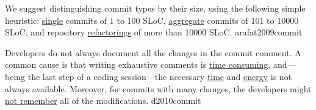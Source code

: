 \documentclass{article}
\begin{document}

  {We suggest distinguishing commit types by their size, using the following simple heuristic: \ul{single} commits of 1 to 100 SLoC, \ul{aggregate} commits of 101 to 10000 SLoC, and repository \ul{refactorings} of more than 10000 SLoC.}
  {arafat2009commit}

  {Developers do not always document all the changes in the commit comment. A common cause is that writing exhaustive comments is \ul{time consuming}, and---being the last step of a coding session---the necessary \ul{time} and \ul{energy} is not always available. Moreover, for commits with many changes, the developers might \ul{not remember} all of the modifications.}
  {d2010commit}
\end{document}
